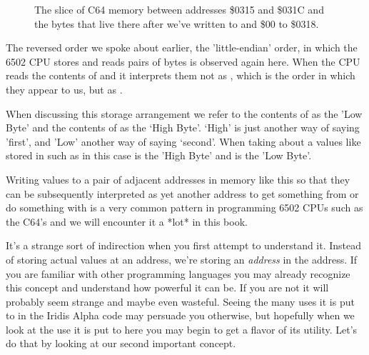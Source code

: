 \begin{figure}[H]
  {
    \setlength{\tabcolsep}{3.0pt}
    \setlength\cmidrulewidth{\heavyrulewidth} %
    \begin{adjustbox}{width=7cm,center}
    \end{adjustbox}
  }\caption{The slice of C64 memory between addresses \$0315 and \$031C and the bytes that live there after we've
written  to  and \$00 to \$0318.}
\end{figure}

The reversed order we spoke about earlier, the 'little-endian' order, in which the 6502 CPU stores and reads
pairs of bytes is observed again here. When the CPU reads the contents of  and 
it interprets them not as , which is the order in which they appear to us, but as .

When discussing this storage arrangement we refer to the contents of  as the 'Low Byte' and the
contents of  as the `High Byte'. `High' is just another way of saying 'first', and 'Low' another
way of saying `second'. When taking about a values like  stored in  such as in this case  is the
'High Byte' and  is the 'Low Byte'.

Writing values to a pair of adjacent addresses in memory like this so that they can
be subsequently interpreted as yet another address to get something from or do something with is a very common
pattern in programming 6502 CPUs such as the C64's and we will encounter it a *lot* in this book.

It's a strange sort of indirection when you first attempt to understand it. Instead of storing actual values
at an address, we're storing an \textit{address} in the address. If you are familiar with other programming languages
you may already recognize this concept and understand how powerful it can be. If you are not it will probably
seem strange and maybe even wasteful. Seeing the many uses it is put to in the Iridis Alpha code may persuade
you otherwise, but hopefully when we look at the use it is put to here you may begin to get a flavor of its
utility. Let's do that by looking at our second important concept.

